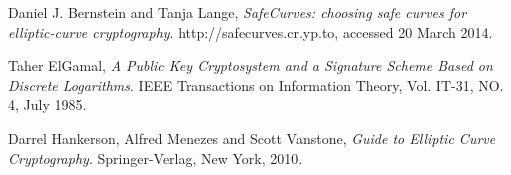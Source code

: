 \begin{thebibliography}{9}
	
		Daniel J. Bernstein and Tanja Lange,
		\emph{SafeCurves: choosing safe curves for elliptic-curve cryptography}.
		http://safecurves.cr.yp.to,
		accessed 20 March 2014.
		
	    Taher ElGamal,
		\emph{A Public Key Cryptosystem and a Signature Scheme Based on Discrete Logarithms}.
		IEEE Transactions on Information Theory, Vol. IT-31, NO. 4,
		July 1985.
	
		Darrel Hankerson, Alfred Menezes and Scott Vanstone,
		\emph{Guide to Elliptic Curve Cryptography}.
		Springer-Verlag, New York,
		2010.
	
\end{thebibliography}